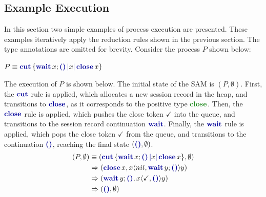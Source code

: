 \subsection{Example Execution}

In this section two simple examples of process execution are presented. These examples iteratively apply the reduction rules shown in the previous section. The type annotations are omitted for brevity. Consider the process $P$ shown below:\vspace{2pt}\\
\vspace{2pt}\centerline{$
    P \equiv \cutc{\waitc{x}{\emptyc}}{x}{\closec{x}}
$}
The execution of $P$ is shown below. The initial state of the \ac{SAM} is $(P, \emptyset)$. First, the $\cutp$ rule is applied, which allocates a new session record in the heap, and transitions to $\closep$, as it corresponds to the positive type $\closet$. Then, the $\closep$ rule is applied, which pushes the close token $\checkmark$ into the queue, and transitions to the session record continuation $\waitp$. Finally, the $\waitp$ rule is applied, which pops the close token $\checkmark$ from the queue, and transitions to the continuation $\emptyc$, reaching the final state $(\emptyc, \emptyset)$.
\[\begin{aligned}
        (P, \emptyset)
         & \equiv
        (\cutc{\waitc{x}{\emptyc}}{x}{\closec{x}}, \emptyset)                \\
         & \Mapsto
        (\closec{x}, x\langle nil, \waitc{y}\emptyc\rangle y)                \\
         & \Mapsto (\waitc{y}\emptyc, x\langle \checkmark, \emptyp\rangle y) \\
         & \Mapsto
        (\emptyc, \emptyset)
\end{aligned}\]

